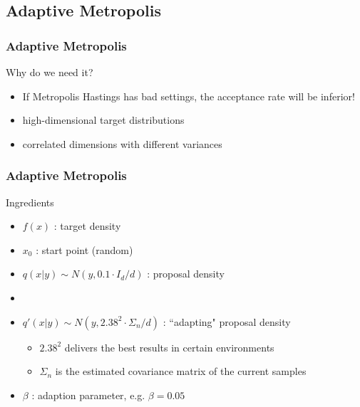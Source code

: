  
\subsection{Adaptive Metropolis}
\begin{frame}
\frametitle{Adaptive Metropolis}
\begin{block}{Why do we need it?}
\begin{itemize}
\item If Metropolis Hastings has bad settings, the acceptance rate will be
inferior!
\item high-dimensional target distributions
\item correlated dimensions with different variances
\end{itemize}
\end{block}

\end{frame}


\begin{frame}
\frametitle{Adaptive Metropolis}

\begin{block}{Ingredients}
\begin{itemize}
\item $f(x)$ : target density
\item $x_0$ : start point (random)
\item $q(x|y)\sim N(y, 0.1\cdot I_d / d)$ : proposal density
\item[]
\item $q'(x|y) \sim N(y, 2.38^2\cdot \Sigma_n /
d)$ : ``adapting" proposal density
\begin{itemize}
  \item $2.38^2$ delivers the best results in certain environments
  \item $\Sigma_n$ is the estimated covariance matrix of the current samples 
\end{itemize}
\item $\beta$ : adaption parameter, e.g. $\beta = 0.05$ 
\end{itemize}
\end{block}

\end{frame}

 


